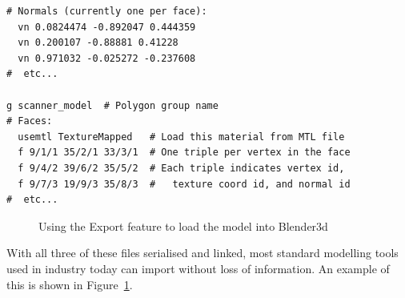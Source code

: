 \documentclass[a4paper,10pt]{article}
\begin{document}
\begin{itemize}
{\begin{verbatim}
# Normals (currently one per face):
  vn 0.0824474 -0.892047 0.444359
  vn 0.200107 -0.88881 0.41228
  vn 0.971032 -0.025272 -0.237608
#  etc...

g scanner_model  # Polygon group name
# Faces:
  usemtl TextureMapped   # Load this material from MTL file
  f 9/1/1 35/2/1 33/3/1  # One triple per vertex in the face
  f 9/4/2 39/6/2 35/5/2  # Each triple indicates vertex id,
  f 9/7/3 19/9/3 35/8/3  #   texture coord id, and normal id
#  etc...
\end{verbatim}

\begin{figure}
  \begin{center}
  \end{center}
  \caption{Using the Export feature to load the model into Blender3d}
  \label{blender}
\end{figure}

With all three of these files serialised and linked, most standard modelling tools used in industry today can import without loss of information. An example of this is shown in Figure~\ref{blender}.}


\end{itemize}
\end{document}

